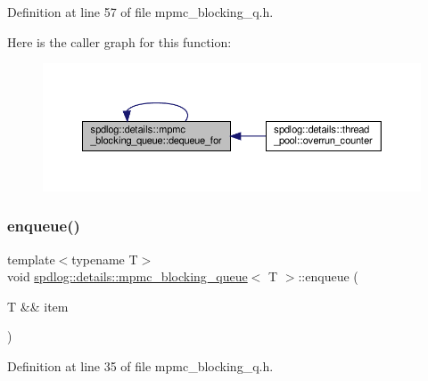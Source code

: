 Definition at line 57 of file mpmc\+\_\+blocking\+\_\+q.\+h.

Here is the caller graph for this function\+:
\nopagebreak
\begin{figure}[H]
\begin{center}
\leavevmode
\includegraphics[width=350pt]{classspdlog_1_1details_1_1mpmc__blocking__queue_af4015ea1657b393755f34d76c97a28d1_icgraph}
\end{center}
\end{figure}
\mbox{\label{classspdlog_1_1details_1_1mpmc__blocking__queue_a3795640b651fcb2de66a21ef2bc221f1}} 
\subsubsection{\texorpdfstring{enqueue()}{enqueue()}}
{\footnotesize\ttfamily template$<$typename T$>$ \\
void \hyperlink{classspdlog_1_1details_1_1mpmc__blocking__queue}{spdlog\+::details\+::mpmc\+\_\+blocking\+\_\+queue}$<$ T $>$\+::enqueue (\begin{DoxyParamCaption}\item[{T \&\&}]{item }\end{DoxyParamCaption})\hspace{0.3cm}{\ttfamily [inline]}}



Definition at line 35 of file mpmc\+\_\+blocking\+\_\+q.\+h.

